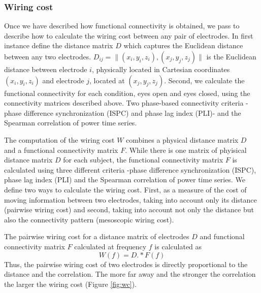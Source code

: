 \documentclass[11pt, onecolumn]{article}
\begin{document}
\subsubsection{Wiring cost}
Once we have described how functional connectivity is obtained, we pass to describe how to calculate the wiring cost between any pair of electrodes. 
In first instance define the distance matrix $D$ which captures the Euclidean distance between any two electrodes. 
$D_{ij} = \Big\|(x_i,y_i,z_i),(x_j,y_j,z_j) \Big\|$ is the Euclidean distance between electrode $i$, physically located in Cartesian coordinates $(x_i,y_i,z_i)$ and electrode $j$, located at $(x_j,y_j,z_j)$.
Second, we calculate the functional connectivity for each condition, eyes open and eyes closed, using the connectivity matrices described above. Two phase-based connectivity criteria -phase difference synchronization (ISPC) and phase lag index (PLI)- and the Spearman correlation of power time series. %

The computation of the wiring cost $W$ combines a physical distance matrix $D$ and a functional connectivity matrix $F$. While there is one matrix of phyisical distance matrix $D$ for each subject, the functional connectivity matrix $F$ is calculated using three different criteria -phase difference synchronization (ISPC), phase lag index (PLI) and the Spearman correlation of power time series.
We define two ways to calculate the wiring cost. First, as a measure of the cost of moving information between two electrodes, taking into account only its distance (pairwise wiring cost) and second, taking into account not only the distance but also the connectivity pattern (mesoscopic wiring cost).

The pairwise wiring cost for a distance matrix of electrodes $D$ and functional connectivity matrix $F$ calculated at frequency $f$ is calculated as
\begin{equation}
W(f) = D.*F(f)
\label{eq:pairwc}
\end{equation} 
Thus, the pairwise wiring cost of two electrodes is directly proportional to the distance and the correlation. The more far away and the stronger the correlation the larger the wiring cost (Figure \ref{fig:wc}). 
\end{document}
